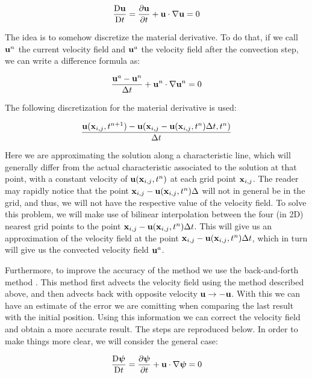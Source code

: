 \begin{equation*}
  \frac{\mathrm{D}\boldsymbol{\mathrm{u}}}{\mathrm{D}t} = \pdv{\boldsymbol{\mathrm{u}}}{t} + \boldsymbol{\mathrm{u}} \cdot \nabla \boldsymbol{\mathrm{u}} = 0
\end{equation*}

The idea is to somehow discretize the material derivative. To do that, if we call $\boldsymbol{\mathrm{u}}^n$ the current velocity field and $\boldsymbol{\mathrm{u}}^a$ the velocity field after the convection step, we can write a difference formula as:

\begin{equation*}
  \frac{\boldsymbol{\mathrm{u}}^a- \boldsymbol{\mathrm{u}}^n}{\Delta t} + \boldsymbol{\mathrm{u}}^n \cdot \nabla \boldsymbol{\mathrm{u}}^n = 0
\end{equation*}

The following discretization for the material derivative is used:

\begin{equation*}
  \frac{\boldsymbol{\mathrm{u}}(\boldsymbol{\mathrm{x}}_{i,j},t^{n+1})  - \boldsymbol{\mathrm{u}}(\boldsymbol{\mathrm{x}}_{i,j} - \boldsymbol{\mathrm{u}}(\boldsymbol{\mathrm{x}}_{i,j},t^n)\Delta t,t^n)}{\Delta t}
\end{equation*}

Here we are approximating the solution along a characteristic line, which will generally differ from the actual characteristic associated to the solution at that point, with a constant velocity of $\boldsymbol{\mathrm{u}}(\boldsymbol{\mathrm{x}}_{i,j},t^n)$ at each grid point $\boldsymbol{\mathrm{x}}_{i,j}$.
The reader may rapidly notice that the point $\boldsymbol{\mathrm{x}}_{i,j} - \boldsymbol{\mathrm{u}}(\boldsymbol{\mathrm{x}}_{i,j},t^n)\Delta$ will not in general be in the grid, and thus, we will not have the respective value of the velocity field. To solve this problem, we will make use of bilinear interpolation between the four (in 2D) nearest grid points to the point $\boldsymbol{\mathrm{x}}_{i,j} - \boldsymbol{\mathrm{u}}(\boldsymbol{\mathrm{x}}_{i,j},t^n)\Delta t$. This will give us an approximation of the velocity field at the point $\boldsymbol{\mathrm{x}}_{i,j} - \boldsymbol{\mathrm{u}}(\boldsymbol{\mathrm{x}}_{i,j},t^n)\Delta t$, which in turn will give us the convected velocity field $\boldsymbol{\mathrm{u}}^a$.

Furthermore, to improve the accuracy of the method we use the back-and-forth method \cite{backforth}. This method first advects the velocity field using the method described above, and then advects back with opposite velocity $\boldsymbol{\mathrm{u}}\to -\boldsymbol{\mathrm{u}}$. With this we can have an estimate of the error we are comitting when comparing the last result with the initial position. Using this information we can correct the velocity field and obtain a more accurate result. The steps are reproduced below. In order to make things more clear, we will consider the general case:

\begin{equation*}
  \frac{\mathrm{D}\boldsymbol{\mathrm{\psi}}}{\mathrm{D}t} = \pdv{\boldsymbol{\mathrm{\psi}}}{t} + \boldsymbol{\mathrm{u}} \cdot \nabla \boldsymbol{\mathrm{\psi}} = 0
\end{equation*}

